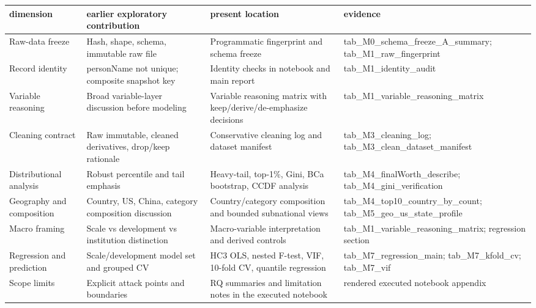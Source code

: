 \begin{tabular}{llll}
\toprule
dimension & earlier exploratory contribution & present location & evidence \\
\midrule
Raw-data freeze & Hash, shape, schema, immutable raw file & Programmatic fingerprint and schema freeze & tab\_M0\_schema\_freeze\_A\_summary; tab\_M1\_raw\_fingerprint \\
Record identity & personName not unique; composite snapshot key & Identity checks in notebook and main report & tab\_M1\_identity\_audit \\
Variable reasoning & Broad variable-layer discussion before modeling & Variable reasoning matrix with keep/derive/de-emphasize decisions & tab\_M1\_variable\_reasoning\_matrix \\
Cleaning contract & Raw immutable, cleaned derivatives, drop/keep rationale & Conservative cleaning log and dataset manifest & tab\_M3\_cleaning\_log; tab\_M3\_clean\_dataset\_manifest \\
Distributional analysis & Robust percentile and tail emphasis & Heavy-tail, top-1\%, Gini, BCa bootstrap, CCDF analysis & tab\_M4\_finalWorth\_describe; tab\_M4\_gini\_verification \\
Geography and composition & Country, US, China, category composition discussion & Country/category composition and bounded subnational views & tab\_M4\_top10\_country\_by\_count; tab\_M5\_geo\_us\_state\_profile \\
Macro framing & Scale vs development vs institution distinction & Macro-variable interpretation and derived controls & tab\_M1\_variable\_reasoning\_matrix; regression section \\
Regression and prediction & Scale/development model set and grouped CV & HC3 OLS, nested F-test, VIF, 10-fold CV, quantile regression & tab\_M7\_regression\_main; tab\_M7\_kfold\_cv; tab\_M7\_vif \\
Scope limits & Explicit attack points and boundaries & RQ summaries and limitation notes in the executed notebook & rendered executed notebook appendix \\
\bottomrule
\end{tabular}
